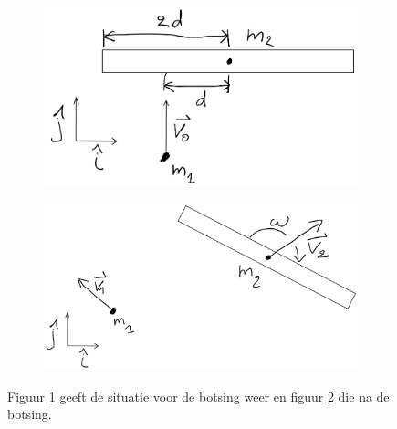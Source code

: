 \documentclass[a4paper,11pt]{article}
\begin{document}
\begin{figure}[H]
	\centering
	\begin{subfigure}[b]{0.45\textwidth}
		\centering
		\includegraphics[width=\textwidth]{VoorBotsing}
		\caption{}
		\label{fig:VoorBotsing}
	\end{subfigure}
	\hfill
	\begin{subfigure}[b]{0.45\textwidth}
		\centering
		\includegraphics[width=\textwidth]{NaBotsing}
		\caption{}
		\label{fig:NaBotsing}
	\end{subfigure}
	\caption{Figuur \ref{fig:VoorBotsing} geeft de situatie voor de botsing weer en figuur \ref{fig:NaBotsing} die na de botsing.}
	\label{fig:Botsing}
\end{figure}
\end{document}
